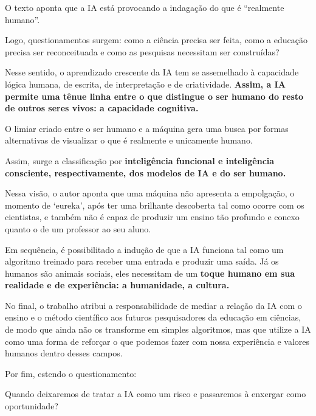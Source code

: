 {\subtitle{Ameaça à própria identidade humana}
    \begin{infobox} O texto aponta que a IA está provocando a indagação do que é “realmente humano”. \end{infobox}

    \hspace{1cm}Logo, questionamentos surgem: como a ciência precisa ser feita, como a educação precisa ser reconceituada e como as pesquisas necessitam ser construídas?

    \hspace{1cm}Nesse sentido, o aprendizado crescente da IA tem se assemelhado à capacidade lógica humana, de escrita, de interpretação e de criatividade. \textbf{Assim, a IA
permite uma tênue linha entre o que distingue o ser humano do resto de outros seres vivos: a capacidade cognitiva.}

\subtitle{Algoritmo x Humanidade}

    \hspace{1cm}O limiar criado entre o ser humano e a máquina gera uma busca por formas alternativas de visualizar o que é realmente e unicamente humano.

    \hspace{1cm}Assim, surge a classificação por \textbf{inteligência funcional e inteligência consciente, respectivamente, dos modelos de IA e do ser humano.}

    \hspace{1cm}Nessa visão, o autor aponta que uma máquina não apresenta a empolgação, o momento de ‘eureka’, após ter uma brilhante descoberta tal como ocorre com os
cientistas, e também não é capaz de produzir um ensino tão profundo e conexo quanto o de um professor ao seu aluno.

    \hspace{1cm}Em sequência, é possibilitado a indução de que a
IA funciona tal como um algoritmo treinado para receber uma entrada e produzir uma saída. Já os humanos são animais sociais, eles necessitam de um \textbf{toque humano
em sua realidade e de experiência: a humanidade, a cultura.}

\subtitle{Como prosseguir?}
    \hspace{1cm}No final, o trabalho atribui a responsabilidade de mediar a relação da IA com o ensino e o método científico aos futuros pesquisadores
da educação em ciências, de modo que ainda não os transforme em simples algoritmos, mas que utilize a IA como uma forma de reforçar
o que podemos fazer com nossa experiência e valores humanos dentro desses campos.

    Por fim, estendo o questionamento:
    \begin{infobox} Quando deixaremos de tratar a IA como um risco e passaremos à enxergar como oportunidade? \end{infobox}



}